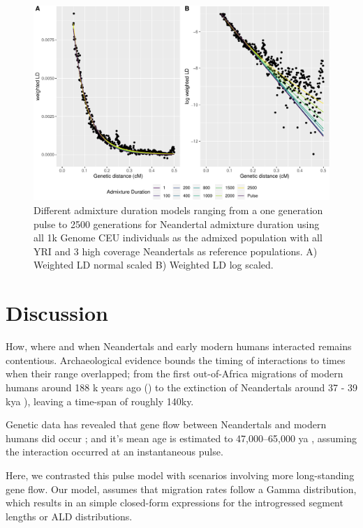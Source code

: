 \documentclass[]{article}
\begin{document}
\begin{figure}
\centering
\includegraphics{Admixture_Time_Inference_Paper_Draft_files/figure-latex/fig5-1.pdf}
\caption{\label{fig:fig5} Different admixture duration models ranging
from a one generation pulse to 2500 generations for Neandertal admixture
duration using all 1k Genome CEU individuals as the admixed population
with all YRI and 3 high coverage Neandertals as reference populations. A) Weighted LD normal scaled B) Weighted LD log scaled.}
\end{figure}

\section{Discussion}\label{discussion}

How, where and when Neandertals and early modern humans interacted remains contentious.  
Archaeological evidence bounds the timing of interactions to times when their range overlapped; from the first out-of-Africa migrations of modern humans around 188 k years ago (\cite{stringer_when_2018,hershkovitz_earliest_2018}) to the extinction of Neandertals around 37 - 39 kya \cite{higham_timing_2014,zilhao_precise_2017}), leaving a time-span of roughly 140ky.

Genetic data has revealed that gene flow between Neandertals and modern humans did occur \cite{green_draft_2010}; and it's mean age is estimated to 47,000–65,000 ya \citep{sankararaman_date_2012}, assuming the interaction occurred at an instantaneous pulse.

Here, we contrasted this pulse model with scenarios involving more long-standing gene flow.  Our model, assumes that migration rates  follow a Gamma distribution, which results in an simple closed-form expressions for the introgressed segment lengths or ALD  distributions. 
\end{document}
